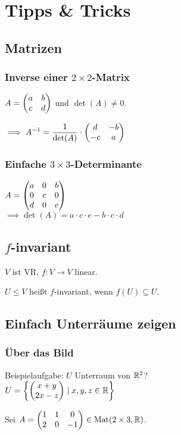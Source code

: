 \section*{Tipps \& Tricks}

\subsection*{Matrizen}

\subsubsection*{Inverse einer $2\times2$-Matrix}
$A=\begin{pmatrix} a & b \\ c & d \end{pmatrix}$ und $\det(A) \neq 0$.

$\displaystyle \implies A^{-1} = \frac{1}{\det(A)}\cdot\begin{pmatrix} d & -b \\ -c & a \end{pmatrix}$

\subsubsection*{Einfache $3\times3$-Determinante}
$A=\begin{pmatrix} a & 0 & b \\ 0 & c & 0 \\ d & 0 & e \end{pmatrix}$ \\
$\implies \det(A)=a\cdot c \cdot e - b \cdot c \cdot d$

\subsection*{$f$-invariant}
$V$ ist VR, $f: V\to V$ linear.

$U\le V$ heißt $f$-invariant, wenn $f(U) \subseteq U$.

\subsection*{Einfach Unterräume zeigen}

\subsubsection*{Über das Bild}
Beispielaufgabe: $U$ Unterraum von $\mathbb{R}^2$? \\
$\displaystyle U=\left\{\begin{pmatrix} x+y \\ 2x-z \end{pmatrix} \mid x,y,z\in\mathbb{R} \right\}$

Sei $\displaystyle A=\begin{pmatrix} 1 & 1 & 0 \\ 2 & 0 & -1 \end{pmatrix} \in\operatorname{Mat}(2 \times 3, \mathbb{R})$.

